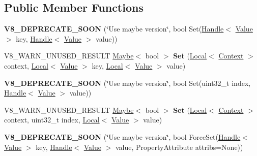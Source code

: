 \subsection*{Public Member Functions}
\begin{DoxyCompactItemize}
\item 
\hypertarget{classv8_1_1_object_ab575cf7cfa70275d27bf8e0353e4bd18}{}{\bfseries V8\+\_\+\+D\+E\+P\+R\+E\+C\+A\+T\+E\+\_\+\+S\+O\+O\+N} (\char`\"{}Use maybe version\char`\"{}, bool Set(\hyperlink{classv8_1_1_local}{Handle}$<$ \hyperlink{classv8_1_1_value}{Value} $>$ key, \hyperlink{classv8_1_1_local}{Handle}$<$ \hyperlink{classv8_1_1_value}{Value} $>$ value))\label{classv8_1_1_object_ab575cf7cfa70275d27bf8e0353e4bd18}

\item 
\hypertarget{classv8_1_1_object_ac5840fc655bea7b2b55a4b49338360ae}{}V8\+\_\+\+W\+A\+R\+N\+\_\+\+U\+N\+U\+S\+E\+D\+\_\+\+R\+E\+S\+U\+L\+T \hyperlink{classv8_1_1_maybe}{Maybe}$<$ bool $>$ {\bfseries Set} (\hyperlink{classv8_1_1_local}{Local}$<$ \hyperlink{classv8_1_1_context}{Context} $>$ context, \hyperlink{classv8_1_1_local}{Local}$<$ \hyperlink{classv8_1_1_value}{Value} $>$ key, \hyperlink{classv8_1_1_local}{Local}$<$ \hyperlink{classv8_1_1_value}{Value} $>$ value)\label{classv8_1_1_object_ac5840fc655bea7b2b55a4b49338360ae}

\item 
\hypertarget{classv8_1_1_object_a50fcfdf347a2783158287b9d9cd81380}{}{\bfseries V8\+\_\+\+D\+E\+P\+R\+E\+C\+A\+T\+E\+\_\+\+S\+O\+O\+N} (\char`\"{}Use maybe version\char`\"{}, bool Set(uint32\+\_\+t index, \hyperlink{classv8_1_1_local}{Handle}$<$ \hyperlink{classv8_1_1_value}{Value} $>$ value))\label{classv8_1_1_object_a50fcfdf347a2783158287b9d9cd81380}

\item 
\hypertarget{classv8_1_1_object_ace0cbcf5659a82106601d07b3e6fa2be}{}V8\+\_\+\+W\+A\+R\+N\+\_\+\+U\+N\+U\+S\+E\+D\+\_\+\+R\+E\+S\+U\+L\+T \hyperlink{classv8_1_1_maybe}{Maybe}$<$ bool $>$ {\bfseries Set} (\hyperlink{classv8_1_1_local}{Local}$<$ \hyperlink{classv8_1_1_context}{Context} $>$ context, uint32\+\_\+t index, \hyperlink{classv8_1_1_local}{Local}$<$ \hyperlink{classv8_1_1_value}{Value} $>$ value)\label{classv8_1_1_object_ace0cbcf5659a82106601d07b3e6fa2be}

\item 
\hypertarget{classv8_1_1_object_a93c67a5686e1e07fc4cdb8fadb4aefb6}{}{\bfseries V8\+\_\+\+D\+E\+P\+R\+E\+C\+A\+T\+E\+\_\+\+S\+O\+O\+N} (\char`\"{}Use maybe version\char`\"{}, bool Force\+Set(\hyperlink{classv8_1_1_local}{Handle}$<$ \hyperlink{classv8_1_1_value}{Value} $>$ key, \hyperlink{classv8_1_1_local}{Handle}$<$ \hyperlink{classv8_1_1_value}{Value} $>$ value, Property\+Attribute attribs=None))\label{classv8_1_1_object_a93c67a5686e1e07fc4cdb8fadb4aefb6}


\end{DoxyCompactItemize}
